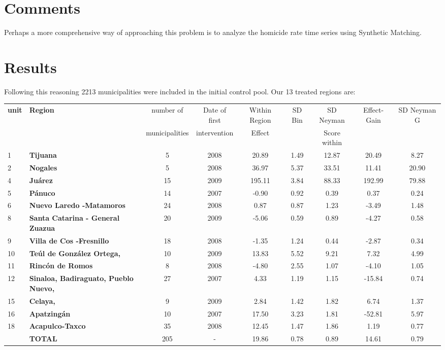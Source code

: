 \documentclass{article}[11 pt]
\begin{document}
\section{Comments}
Perhaps a more comprehensive way of approaching this problem is to analyze the homicide rate time series using Synthetic Matching.

\section{Results}
Following this reasoning 2213 municipalities were included in the initial control pool. Our 13 treated regions are:



\begin{table}[ht]
\begin{center}
\begin{tabular}{llccccccc}
  \hline
 \textbf{unit}& \textbf{Region}& number of& Date of first & Within Region & SD Bin& SD Neyman &Effect- Gain&SD Neyman G\\
 && municipalities& intervention& Effect&& Score within&\\
  \hline
1&\textbf{Tijuana} &   5 & 2008 &20.89 & 1.49 & 12.87&20.49 & 8.27 \\  
2&		  \textbf{Nogales} &   5 & 2008 &36.97 & 5.37 & 33.51& 11.41 & 20.90 \\
4&		  \textbf{Ju\'{a}rez} &  15 & 2009 & 195.11 & 3.84 & 88.33 & 192.99 & 79.88 \\   
5&		  \textbf{P\'{a}nuco} &  14 & 2007 &  -0.90 & 0.92 & 0.39& 0.37 & 0.24 \\
6&		  \textbf{Nuevo Laredo -Matamoros} &  24 & 2008 &  0.87 & 0.87 & 1.23  & -3.49 & 1.48 \\  
8&		  \textbf{Santa Catarina - General Zuazua} &  20 & 2009 &  -5.06 & 0.59 & 0.89 & -4.27 & 0.58 \\  
9&		  \textbf{Villa de Cos -Fresnillo} &  18 & 2008 &-1.35 & 1.24 & 0.44 & -2.87 & 0.34 \\  
10&		\textbf{Te\'{u}l de Gonz\'{a}lez Ortega,} &10 & 2009&13.83 & 5.52 & 9.21& 7.32 & 4.99 \\ 
11&		\textbf{Rinc\'{o}n de Romos} & 8 & 2008&-4.80 & 2.55 & 1.07& -4.10 & 1.05\\
12&		\textbf{Sinaloa, Badiraguato, Pueblo Nuevo,} &27 & 2007& 4.33 & 1.19 & 1.15 & -15.84 & 0.74 \\ 
15&		\textbf{Celaya,} &9 & 2009  &2.84 & 1.42 & 1.82& 6.74 & 1.37 \\ 
16&		\textbf{Apatzing\'{a}n} &10 & 2007 &17.50 & 3.23 & 1.81 &-52.81 & 5.97 \\  
18&		\textbf{Acapulco-Taxco} &35 & 2008 & 12.45 & 1.47 & 1.86 & 1.19 & 0.77 \\ 
&		 \textbf{TOTAL}& 205& - &19.86& 0.78&  0.89&14.61& 0.79\\
\hline
\end{tabular}
\end{center}
\end{table}
	
\end{document}
